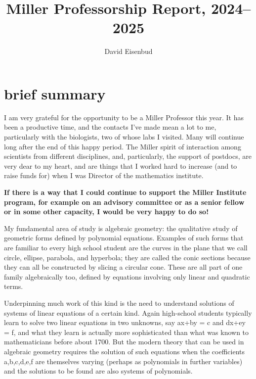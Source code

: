 \documentclass[11pt]{amsart}
\title{Miller Professorship Report, 2024--2025}
\author{David Eisenbud}
\begin{document}
\maketitle

\section{brief summary}
I am very grateful for the opportunity to be a Miller Professor this year. It has been a productive time, and the contacts I've made mean a lot to me, particularly with the biologists, two of  whose labs I visited. Many will continue long after the end of this happy period. The Miller spirit of interaction among scientists from different disciplines, and, particularly,  the support of postdocs, are very dear to my heart, and are things that I worked hard to increase (and to raise funds for) when I was Director of the mathematics institute.

{\bf If there is a way that I could continue to support the Miller Institute program, for example on an advisory committee or as a senior fellow or in some other capacity, I would be very happy to do so!}

My fundamental area of study is algebraic geometry: the qualitative study of geometric forms defined by polynomial equations. Examples of such forms that are familiar to every high school student are the curves in the plane that we call circle, ellipse, parabola, and hyperbola; they are called the conic sections because they can all be constructed by slicing a circular cone. These are all part of one family algebraically too, defined by equations involving only linear and quadratic terms. 

   Underpinning much work of this kind is the need to understand solutions of systems of linear equations of a certain kind. Again high-school students typically learn to solve two
linear equations in two unknowns, say ax+by = c and dx+ey = f, and what they learn is actually more sophisticated than what was known to mathematicians before about 1700. But the modern theory that can be used in algebraic geometry requires the solution of such equations when the coefficients a,b,c,d,e,f are themselves varying (perhaps as polynomials in further variables) and the solutions to be found are also systems of polynomials. 
\end{document}
